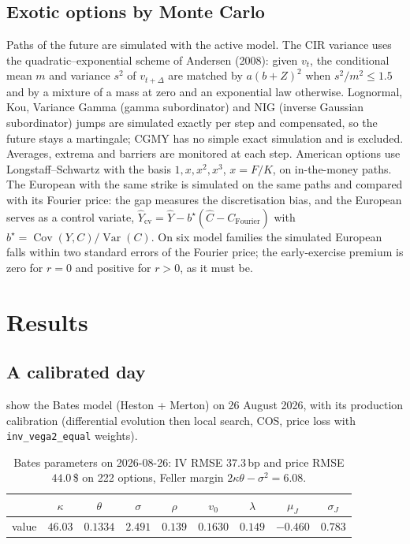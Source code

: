 \documentclass[11pt,a4paper]{article}
\theoremstyle{definition}
\theoremstyle{remark}
\begin{document}
\subsection{Exotic options by Monte Carlo}
Paths of the future are simulated with the active model. The CIR variance uses the quadratic--exponential scheme of Andersen
(2008): given $v_t$, the conditional mean $m$ and variance $s^2$ of $v_{t+\Delta}$ are matched by $a(b+Z)^2$ when
$s^2/m^2\le1.5$ and by a mixture of a mass at zero and an exponential law otherwise. Lognormal, Kou, Variance Gamma (gamma
subordinator) and NIG (inverse Gaussian subordinator) jumps are simulated exactly per step and compensated, so the future stays
a martingale; CGMY has no simple exact simulation and is excluded. Averages, extrema and barriers are monitored at each step.
American options use Longstaff--Schwartz with the basis $1,x,x^2,x^3$, $x=F/K$, on in-the-money paths. The European with the same
strike is simulated on the same paths and compared with its Fourier price: the gap measures the discretisation bias, and the
European serves as a control variate, $\hat Y_{\mathrm{cv}}=\hat Y-b^\star(\hat C-C_{\mathrm{Fourier}})$ with
$b^\star=\operatorname{Cov}(Y,C)/\operatorname{Var}(C)$. On six model families the simulated European falls within two standard
errors of the Fourier price; the early-exercise premium is zero for $r=0$ and positive for $r>0$, as it must be.

\section{Results}\label{sec:results}
\subsection{A calibrated day}
 show the Bates model (Heston + Merton) on 26 August 2026, with its production calibration
(differential evolution then local search, COS, price loss with \texttt{inv\_vega2\_equal} weights).

\begin{table}[ht]\centering\small
\begin{tabular}{@{}lcccccccc@{}}\toprule
 & $\kappa$ & $\theta$ & $\sigma$ & $\rho$ & $v_0$ & $\lambda$ & $\mu_J$ & $\sigma_J$\\\midrule
value & $46.03$ & $0.1334$ & $2.491$ & $0.139$ & $0.1630$ & $0.149$ & $-0.460$ & $0.783$\\\bottomrule
\end{tabular}
\caption{Bates parameters on 2026-08-26: IV RMSE $37.3$\,bp and price RMSE $44.0$\,\$ on 222 options, Feller margin
$2\kappa\theta-\sigma^2=6.08$.}\label{tab:bates}
\end{table}
\end{document}
